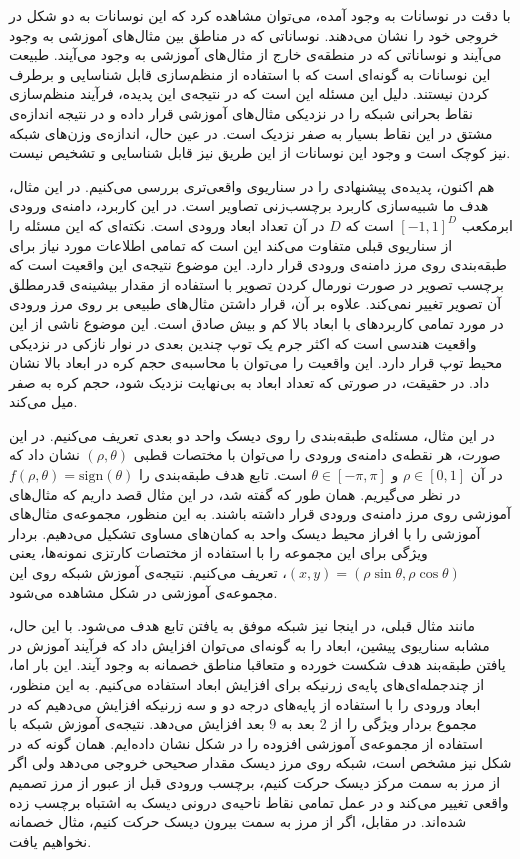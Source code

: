 \documentclass[12pt,onecolumn,a4paper]{article}
\begin{document}
با دقت در نوسانات به وجود آمده، می‌توان مشاهده کرد که این نوسانات به دو شکل در خروجی خود را نشان می‌دهند. نوساناتی که در مناطق بین مثال‌های آموزشی به وجود می‌آیند و نوساناتی که در منطقه‌ی خارج از مثال‌های آموزشی به وجود می‌آیند. طبیعت این نوسانات به گونه‌ای است که با استفاده از منظم‌سازی قابل شناسایی و برطرف کردن نیستند. دلیل این مسئله این است که در نتیجه‌ی این پدیده، فرآیند منظم‌سازی نقاط بحرانی شبکه را در نزدیکی مثال‌های آموزشی قرار داده و در نتیجه اندازه‌ی مشتق در این نقاط بسیار به صفر نزدیک است. در عین حال، اندازه‌ی وزن‌های شبکه نیز کوچک است و وجود این نوسانات از این طریق نیز قابل شناسایی و تشخیص نیست.

هم اکنون، پدیده‌ی پیشنهادی را در سناریوی واقعی‌تری بررسی می‌کنیم. در این مثال، هدف ما شبیه‌سازی کاربرد برچسب‌زنی تصاویر است. در این کاربرد، دامنه‌ی ورودی ابرمکعب $[-1,1]^D$ 
است که $D$ 
در آن تعداد ابعاد ورودی است. نکته‌ای که این مسئله را از سناریوی قبلی متفاوت می‌کند این است که تمامی اطلاعات مورد نیاز برای طبقه‌بندی روی مرز دامنه‌ی ورودی قرار دارد. این موضوع نتیجه‌ی این واقعیت است که برچسب تصویر در صورت نورمال کردن تصویر با استفاده از مقدار بیشینه‌ی قدرمطلق آن تصویر تغییر نمی‌کند. علاوه بر آن، قرار داشتن مثال‌های طبیعی بر روی مرز ورودی در مورد تمامی کاربردهای با ابعاد بالا کم و بیش صادق است. این موضوع ناشی از این واقعیت هندسی است که اکثر جرم یک توپ چندین بعدی در نوار نازکی در نزدیکی محیط توپ قرار دارد. این واقعیت را می‌توان با محاسبه‌ی حجم کره در ابعاد بالا نشان داد. در حقیقت، در صورتی که تعداد ابعاد به بی‌نهایت نزدیک شود، حجم کره به صفر میل می‌کند.

در این مثال، مسئله‌ی طبقه‌بندی را روی دیسک واحد دو بعدی تعریف می‌کنیم. در این صورت، هر نقطه‌ی دامنه‌ی ورودی را می‌توان با مختصات قطبی $(\rho,\theta)$ 
 نشان داد که در آن $\rho \in [0,1]$ و $\theta \in [-\pi,\pi]$ است. 
 تابع هدف طبقه‌بندی را $f(\rho,\theta)=\mathrm{sign}(\theta)$ در نظر می‌گیریم.
همان طور که گفته شد، در این مثال قصد داریم که مثال‌های آموزشی روی مرز دامنه‌ی ورودی قرار داشته باشند. به این منظور، مجموعه‌ی مثال‌های آموزشی را با افراز محیط دیسک واحد به کمان‌های مساوی تشکیل می‌دهیم. بردار ویژگی برای این مجموعه را با استفاده از مختصات کارتزی نمونه‌ها، یعنی $(x,y)=(\rho\sin\theta,\rho\cos\theta)$، تعریف می‌کنیم. نتیجه‌ی آموزش شبکه روی این مجموعه‌ی آموزشی در شکل مشاهده می‌شود.

مانند مثال قبلی، در اینجا نیز شبکه موفق به یافتن تابع هدف می‌شود. با این حال، مشابه سناریوی پیشین، ابعاد را به گونه‌ای می‌توان افزایش داد که فرآیند آموزش در یافتن طبقه‌بند هدف شکست خورده و متعاقبا مناطق خصمانه به وجود آیند. این بار اما، از چندجمله‌ای‌های پایه‌ی زرنیکه برای افزایش ابعاد استفاده می‌کنیم. به این منظور، ابعاد ورودی را با استفاده از پایه‌های درجه دو و سه زرنیکه افزایش می‌دهیم که در مجموع بردار ویژگی را از 2 بعد به 9 بعد افزایش می‌دهد. نتیجه‌ی آموزش شبکه با استفاده از مجموعه‌ی آموزشی افزوده را در شکل نشان داده‌ایم. همان گونه که در شکل نیز مشخص است، شبکه روی مرز دیسک مقدار صحیحی خروجی می‌دهد ولی اگر از مرز به سمت مرکز دیسک حرکت کنیم، برچسب ورودی قبل از عبور از مرز تصمیم واقعی تغییر می‌کند و در عمل تمامی نقاط ناحیه‌ی درونی دیسک به اشتباه برچسب زده شده‌اند. در مقابل، اگر از مرز به سمت بیرون دیسک حرکت کنیم، مثال خصمانه نخواهیم یافت.
\end{document}
